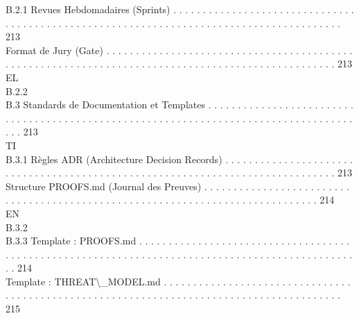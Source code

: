 \documentclass[12pt,landscape,a4paper]{article}
\begin{document}
B.2.1              Revues Hebdomadaires (Sprints) . . . . . . . . . . . . . . . . . . . . . . . . . . . . . . . . . . . . . . . . . . . . . . . . . . . . . . . . . . . . . . . . . . . . . . . . . . . . . . . . . . . . . . . . 213\\
Format de Jury (Gate) . . . . . . . . . . . . . . . . . . . . . . . . . . . . . . . . . . . . . . . . . . . . . . . . . . . . . . . . . . . . . . . . . . . . . . . . . . . . . . . . . . . . . . . . . . . . . . . . . . 213\\
\vspace{0.5em}
\vspace{0.5em}
\vspace{0.5em}
\vspace{0.5em}
EL\\
B.2.2\\
B.3     Standards de Documentation et Templates . . . . . . . . . . . . . . . . . . . . . . . . . . . . . . . . . . . . . . . . . . . . . . . . . . . . . . . . . . . . . . . . . . . . . . . . . . . . . . . . . . . . . . . 213\\
\vspace{0.5em}
\vspace{0.5em}
\vspace{0.5em}
\vspace{0.5em}
TI\\
B.3.1              Règles ADR (Architecture Decision Records) . . . . . . . . . . . . . . . . . . . . . . . . . . . . . . . . . . . . . . . . . . . . . . . . . . . . . . . . . . . . . . . . . . . . . . . . . . . . . . 213\\
Structure PROOFS.md (Journal des Preuves) . . . . . . . . . . . . . . . . . . . . . . . . . . . . . . . . . . . . . . . . . . . . . . . . . . . . . . . . . . . . . . . . . . . . . . . . . . . . . . 214\\
\vspace{0.5em}
\vspace{0.5em}
\vspace{0.5em}
\vspace{0.5em}
EN\\
B.3.2\\
B.3.3              Template : PROOFS.md . . . . . . . . . . . . . . . . . . . . . . . . . . . . . . . . . . . . . . . . . . . . . . . . . . . . . . . . . . . . . . . . . . . . . . . . . . . . . . . . . . . . . . . . . . . . . . . . . 214\\
Template : THREAT\textbackslash{}_MODEL.md . . . . . . . . . . . . . . . . . . . . . . . . . . . . . . . . . . . . . . . . . . . . . . . . . . . . . . . . . . . . . . . . . . . . . . . . . . . . . . . . . . . . . . . . . 215\\
\end{document}
